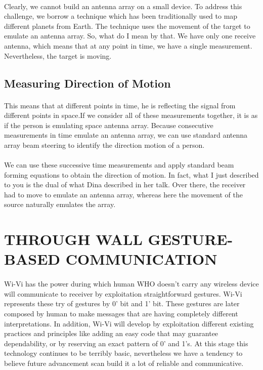 \documentclass[a4paper,12pt,oneside]{article}
\begin{document}
\paragraph{}
Clearly, we cannot build an antenna array on a small device. To address this challenge,
we borrow a technique which has been traditionally used to map different planets from Earth.
The technique uses the movement of the target to emulate an antenna array. So, what do I mean
by that. We have only one receive antenna, which means that at any point in time, we have a
single measurement. Nevertheless, the target is moving.

\subsection{Measuring Direction of Motion}



\paragraph{}
This means that at different points in time, he is reflecting the signal from different points
in space.If we consider all of these measurements together, it is as if the person is emulating space
antenna array. Because consecutive measurements in time emulate an antenna array, we can use
standard antenna array beam steering to identify the direction motion of a person.



\paragraph{}
We can use these successive time measurements and apply standard beam forming
equations to obtain the direction of motion.
In fact, what I just described to you is the dual of what Dina described in her talk. Over
there, the receiver had to move to emulate an antenna array, whereas here the movement of the
source naturally emulates the array.

\newpage
\section{THROUGH WALL GESTURE-BASED COMMUNICATION}
\paragraph{}
Wi-Vi has the power during which human WHO doesn't carry any wireless device will
communicate to receiver by exploitation straightforward gestures. Wi-Vi represents these try of
gestures by 0’ bit and 1’ bit. These gestures are later composed by human to make messages that
are having completely different interpretations. In addition, Wi-Vi will develop by exploitation
different existing practices and principles like adding an easy code that may guarantee
dependability, or by reserving an exact pattern of 0’ and 1’s. At this stage this technology
continues to be terribly basic, nevertheless we have a tendency to believe future advancement
scan build it a lot of reliable and communicative.
\end{document}
